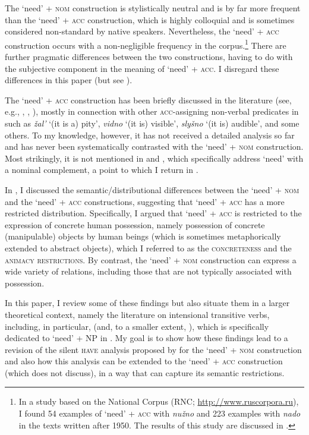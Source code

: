 \documentclass[output=paper]{langscibook}
\begin{document}
\noindent The `need' + \textsc{nom} construction is stylistically neutral and is by far more frequent than the `need' + \textsc{acc} construction, which is highly colloquial and is sometimes considered non-standard by native speakers. Nevertheless, the `need' + \textsc{acc} construction occurs with a non-negligible frequency in the corpus.\footnote{In a study based on the  National Corpus (RNC; \url{http://www.ruscorpora.ru}), I found 54 examples of `need' + \textsc{acc} with \textit{nužno} and 223 examples with \textit{nado} in the texts written after 1950. The results of this study are discussed in \citealt{Knyazev2020}.} There are further pragmatic differences between the two constructions, having to do with the subjective component in the meaning of `need' + \textsc{acc}. I disregard these differences in this paper (but see \citealt{Knyazev2020}).

The `need' + \textsc{acc} construction has been briefly discussed in the literature (see, e.g., \citealt[325--327]{Svedova1980}, \citealt[213]{Pesetsky1982}, \citealt[28]{Mikaelian.Roudet1999}), mostly in connection with other \textsc{acc}-assigning non-verbal predicates in  such as \textit{žal'} `(it is a) pity', \textit{vidno} `(it is) visible', \textit{slyšno} `(it is) audible', and some others. To my knowledge, however, it has not received a detailed analysis so far and has never been systematically contrasted with the `need' + \textsc{nom} construction. Most strikingly, it is not mentioned in \citet{Harves2008} and \citet{Harves.Kayne2012}, which specifically address  `need' with a nominal complement, a point to which I return in .

In \citet{Knyazev2020}, I discussed the semantic/distributional differences between the `need' + \textsc{nom} and the `need' + \textsc{acc} constructions, suggesting that `need' + \textsc{acc} has a more restricted distribution. Specifically, I argued that `need' + \textsc{acc} is restricted to the expression of concrete human possession, namely possession of concrete (manipulable) objects by human beings (which is sometimes metaphorically extended to abstract objects), which I referred to as the \textsc{concreteness} and the \textsc{animacy restrictions}. By contrast, the `need' + \textsc{nom} construction can express a wide variety of relations, including those that are not typically associated with possession.

In this paper, I review some of these findings but also situate them in a larger theoretical context, namely the literature on intensional transitive verbs, including, in particular, \citet{Harves2008} (and, to a smaller extent, \citealt{Harves.Kayne2012}), which is specifically dedicated to `need' + NP in . My goal is to show how these findings lead to a revision of the silent \textsc{have} analysis proposed by \citet{Harves2008} for the `need' + \textsc{nom} construction and also how this analysis can be extended to the `need' + \textsc{acc} construction (which \citeauthor{Harves2008} does not discuss), in a way that can capture its semantic restrictions.
\end{document}
